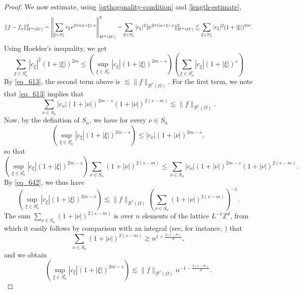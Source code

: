 \begin{proof}
 We now estimate, using \eqref{orthogonality-condition} and \eqref{length-estimate},
 \begin{equation}\label{eq_634}
  \|f - f_n\|^2_{H^m(\Omega^\prime)} = \left\|\sum_{\xi\in S_n^c} c_\xi e^{2\pi {\mathrm{i}\mkern1mu}  (a+\xi)\cdot x} \right\|^2_{H^m(\Omega^\prime)} = \sum_{\xi\in S_n^c} |c_\xi|^2\|e^{2\pi {\mathrm{i}\mkern1mu}  (a+\xi)\cdot x}\|_{H^m(\Omega^\prime)}^2 \lesssim \sum_{\xi\in S_n^c} |c_\xi|^2(1+|\xi|)^{2m}.
 \end{equation}
 Using Hoelder's inequality, we get
 \begin{equation}\label{eq_638}
  \sum_{\xi\in S_n^c} |c_\xi|^2(1+|\xi|)^{2m} \leq \left(\sup_{\xi\in S_n^c} |c_\xi|(1+|\xi|)^{2m-s} \right)\left(\sum_{\xi\in S_n^c}|c_\xi|(1+|\xi|)^{s}\right)
 \end{equation}
 By \eqref{eq_613}, the second term above is $\lesssim \|f\|_{\mathcal{B}^s(\Omega)}$. For the first term, we note that \eqref{eq_613} implies that
 \begin{equation}\label{eq_642}
  \sum_{\nu\in S_n} |c_\nu|(1+|\nu|)^{2m-s}(1+|\nu|)^{2(s-m)}\lesssim \|f\|_{\mathcal{B}^s(\Omega)}.
 \end{equation}
 Now, by the definition of $S_n$, we have for every $\nu\in S_n$
 \begin{equation}
  \left(\sup_{\xi\in S_n^c} |c_\xi|(1+|\xi|)^{2m-s}\right) \leq |c_\nu|(1+|\nu|)^{2m-s},
 \end{equation}
 so that
 \begin{equation}
  \left(\sup_{\xi\in S_n^c} |c_\xi|(1+|\xi|)^{2m-s}\right)\sum_{\nu\in S_n}(1+|\nu|)^{2(s-m)} \leq \sum_{\nu\in S_n} |c_\nu|(1+|\nu|)^{2m-s}(1+|\nu|)^{2(s-m)}.
 \end{equation}
 By \eqref{eq_642}, we thus have
 \begin{equation}
  \left(\sup_{\xi\in S_n^c} |c_\xi|(1+|\xi|)^{2m-s}\right) \lesssim \|f\|_{\mathcal{B}^s(\Omega)}\left(\sum_{\nu\in S_n}(1+|\nu|)^{2(s-m)}\right)^{-1}.
 \end{equation}
 The sum $\sum_{\nu\in S_n}(1+|\nu|)^{2(s-m)}$ is over $n$ elements of the lattice $L^{-1}\mathbb{Z}^d$, from which it easily follows by comparison with an integral (see, for instance, \cite{erdos1989lattice}) that
 \begin{equation}
  \sum_{\nu\in S_n}(1+|\nu|)^{2(s-m)} \gtrsim n^{1+\frac{2(s-m)}{d}},
 \end{equation}
 and we obtain
 \begin{equation}
  \left(\sup_{\xi\in S_n^c} |c_\xi|(1+|\xi|)^{2m-s}\right) \lesssim \|f\|_{\mathcal{B}^s(\Omega)}n^{-1-\frac{2(s-m)}{d}}.

\end{equation}
\end{proof}
